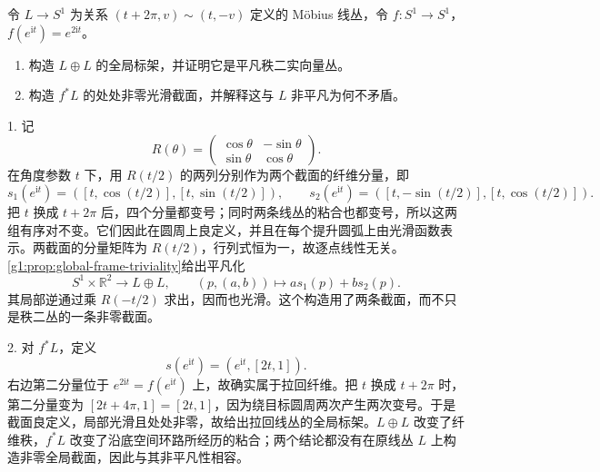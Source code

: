 \BookExercises

\begin{exercise}\label{g1:ex:mobius-sum-double-pullback}
	令 \(L\to S^1\) 为关系 \((t+2\pi,v)\sim(t,-v)\) 定义的 Möbius 线丛，令 \(f:S^1\to S^1\)，\(f(e^{\mathrm{i}t})=e^{2\mathrm{i}t}\)。
	\begin{enumerate}
		\item 构造 \(L\oplus L\) 的全局标架，并证明它是平凡秩二实向量丛。
		\item 构造 \(f^*L\) 的处处非零光滑截面，并解释这与 \(L\) 非平凡为何不矛盾。
	\end{enumerate}
\end{exercise}
\begin{solution}
	1. 记
	\[
		R(\theta)=\begin{pmatrix}\cos\theta&-\sin\theta\\\sin\theta&\cos\theta\end{pmatrix}.
	\]
	在角度参数 \(t\) 下，用 \(R(t/2)\) 的两列分别作为两个截面的纤维分量，即
	\[
		s_1(e^{\mathrm{i}t})=([t,\cos(t/2)],[t,\sin(t/2)]),\qquad
		s_2(e^{\mathrm{i}t})=([t,-\sin(t/2)],[t,\cos(t/2)]).
	\]
	把 \(t\) 换成 \(t+2\pi\) 后，四个分量都变号；同时两条线丛的粘合也都变号，所以这两组有序对不变。它们因此在圆周上良定义，并且在每个提升圆弧上由光滑函数表示。两截面的分量矩阵为 \(R(t/2)\)，行列式恒为一，故逐点线性无关。\cref{g1:prop:global-frame-triviality}给出平凡化
	\[
		S^1\times\mathbb R^2\longrightarrow L\oplus L,
		\qquad(p,(a,b))\longmapsto a s_1(p)+b s_2(p).
	\]
	其局部逆通过乘 \(R(-t/2)\) 求出，因而也光滑。这个构造用了两条截面，而不只是秩二丛的一条非零截面。

	2. 对 \(f^*L\)，定义
	\[
		s(e^{\mathrm{i}t})=(e^{\mathrm{i}t},[2t,1]).
	\]
	右边第二分量位于 \(e^{2\mathrm{i}t}=f(e^{\mathrm{i}t})\) 上，故确实属于拉回纤维。把 \(t\) 换成 \(t+2\pi\) 时，第二分量变为 \([2t+4\pi,1]=[2t,1]\)，因为绕目标圆周两次产生两次变号。于是截面良定义，局部光滑且处处非零，故给出拉回线丛的全局标架。\(L\oplus L\) 改变了纤维秩，\(f^*L\) 改变了沿底空间环路所经历的粘合；两个结论都没有在原线丛 \(L\) 上构造非零全局截面，因此与其非平凡性相容。
\end{solution}

